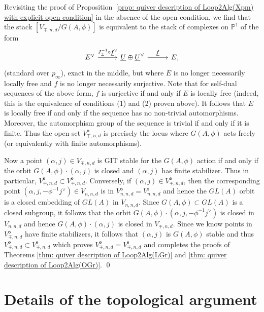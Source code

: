 \message{ !name(Bryan-Vakil.tex)}\documentclass{amsart}
\theoremstyle{definition}
\newcommand{\PP}{\mathbb{P}}
\newcommand{\UL}[1]{\underline{#1}}
\newcommand{\open}{\mathsf{o}}
\newcommand{\stable}{\mathsf{s}}
\begin{document}
Revisiting the proof of Proposition~\ref{prop: quiver description of
Loop2Alg(Xpm) with explicit open condition} in the absence of the open
condition, we find that the stack $[V_{\mp ,n,d} / G(A,\phi )]$ is
equivalent to the stack of complexes on $\PP^{1}$ of the form
\[
\begin{tikzcd}[column sep={6em,between origins}]
E^{\vee } \arrow[r, "J_{\pm }^{-1}\circ \UL{f}^{\vee}"] &
\UL{U}\oplus \UL{U}^{\vee } \arrow[r, "\UL{f}"] & E,
\end{tikzcd}
\]
(standard over $p_{\infty}$), exact in the middle, but where $E$ is no
longer necessarily locally free and $\UL{f}$ is no longer necessarily
surjective. Note that for self-dual sequences of the above form,
$\UL{f}$ is surjective if and only if $E$ is locally free (indeed,
this is the equivalence of conditions (1) and (2) proven above). It
follows that $E$ is locally free if and only if the sequence has no
non-trivial automorphisms. Moreover, the automorphism group of the
sequence is trivial if and only if it is finite. Thus the open set
$V^{\open}_{\mp ,n,d}$ is precisely the locus where $G(A,\phi )$ acts
freely (or equivalently with finite automorphisms).

Now a point $(\alpha ,j)\in V_{\mp ,n,d}$ is GIT stable for the
$G(A,\phi )$ action if and only if the orbit $G(A,\phi )\cdot (\alpha
,j)$ is closed and $(\alpha ,j)$ has finite stabilizer. Thus in
particular, $V^{\stable}_{\mp ,n,d}\subset V^{\open}_{\mp
,n,d}$. Conversely, if $(\alpha ,j)\in V^{\open}_{\mp ,n,d}$, then the
corresponding point $(\alpha ,j,-\phi^{-1}j^{\vee})\in V_{n,n,d}$ is
in $V^{\open}_{n,n,d}=V^{\stable}_{n,n,d}$ and hence the $GL(A)$ orbit
is a closed embedding of $GL(A)$ in $V_{n,n,d}$. Since $G(A,\phi
)\subset GL(A)$ is a closed subgroup, it follows that the orbit
$G(A,\phi )\cdot (\alpha ,j,-\phi^{-1}j^{\vee})$ is closed in
$V_{n,n,d}$ and hence $G(A,\phi )\cdot (\alpha ,j)$ is closed in
$V_{\mp ,n,d}$. Since we know points in $V^{\open}_{\mp ,n,d}$ have
finite stabilizers, it follows that $(\alpha ,j)$ is $G(A,\phi )$
stable and thus $V^{\open}_{\mp ,n,d}\subset V^{\stable }_{\mp ,n,d}$
which proves $V^{\open}_{\mp ,n,d}=V^{\stable }_{\mp ,n,d}$ and
completes the proofs of Theorems \ref{thm: quiver description of
Loop2Alg(LGr)} and \ref{thm: quiver description of
Loop2Alg(OGr)}. \qed

\section{Details of the topological argument}\label{sec: topological details}
\end{document}
